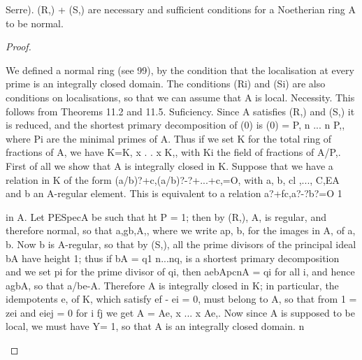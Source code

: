 \begin{theorem}[Theorem 23.8]\label{mcrt-auto-theorem-23-8}\uses{}
\begin{mathematicalrecord}
Serre). (R,) + (S,) are necessary and sufficient conditions
    for a Noetherian   ring A to be normal.
\end{mathematicalrecord}
\end{theorem}
\begin{proof}
\begin{mathematicalrecord}
We defined a normal        ring (see 99), by the condition that the
    localisation at every prime is an integrally closed domain. The conditions
    (Ri) and (Si) are also conditions on localisations, so that we can assume
    that A is local.
    Necessity. This follows from Theorems 11.2 and 11.5.
    Suficiency. Since A satisfies (R,) and (S,) it is reduced, and the shortest
    primary decomposition of (0) is (0) = P, n ... n P,, where Pi are the minimal
    primes of A. Thus if we set K for the total ring of fractions of A, we have
               K=K,   x . . x K,, with Ki the field of fractions of A/P,.
    First of all we show that A is integrally closed in K. Suppose that we
    have a relation in K of the form
             (a/b)?+c,(a/b)?-?+...+c,=O,
    with a, b, cl ,..., C,EA and b an A-regular element. This is equivalent    to
    a relation
            a?+fc,a?-?b?=O
                   1

    in A. Let PESpecA be such that ht P = 1; then by (R,), A, is regular,
    and therefore normal, so that a,gb,A,, where we write ap, b, for the
images in A, of a, b. Now b is A-regular, so that by (S,), all the prime
divisors of the principal ideal bA have height 1; thus if bA = q1 n...nq,
is a shortest primary decomposition and we set pi for the prime divisor
of qi, then aebApcnA = qi for all i, and hence agbA, so that a/be-A.
Therefore A is integrally closed in K; in particular, the idempotents e, of
 K, which satisfy ef - ei = 0, must belong to A, so that from 1 = zei and
eiej = 0 for i fj we get
          A = Ae, x ... x Ae,.
Now since A is supposed to be local, we must have Y= 1, so that A is an
integrally closed domain.      n
\end{mathematicalrecord}
\end{proof}


